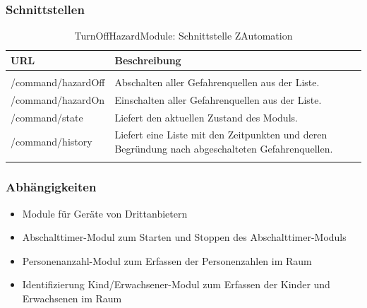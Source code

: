 \subsubsection{Schnittstellen}
\begin{longtabu} to 
	\hline
	\textbf{URL}				& \textbf{Beschreibung} \\
	\hline
	\endhead
	
	  \\
	\endfoot
	\endlastfoot
	/command/hazardOff			& Abschalten aller Gefahrenquellen aus der Liste. \\
	\hline
	/command/hazardOn			& Einschalten aller Gefahrenquellen aus der Liste. \\
	\hline 
	/command/state				& Liefert den aktuellen Zustand des Moduls. \\
	\hline
	/command/history			& Liefert eine Liste mit den Zeitpunkten und deren Begründung nach abgeschalteten Gefahrenquellen. \\
	\hline
	
	\caption{TurnOffHazardModule: Schnittstelle ZAutomation}
\end{longtabu}

\subsubsection{Abhängigkeiten}
\begin{itemize}
	\item Module für Geräte von Drittanbietern
	\item Abschalttimer-Modul zum Starten und Stoppen des Abschalttimer-Moduls
	\item Personenanzahl-Modul zum Erfassen der Personenzahlen im Raum
	\item Identifizierung Kind/Erwachsener-Modul zum Erfassen der Kinder und Erwachsenen im Raum
\end{itemize}


